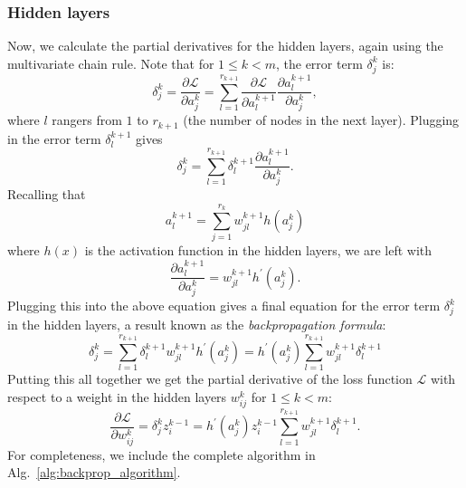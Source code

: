 \documentclass[../main.tex]{subfiles}
\begin{document}
\subsubsection{Hidden layers}
Now, we calculate the partial derivatives for the hidden layers, again using
the multivariate chain rule.
%
Note that for $1 \leq k < m$, the error term $\delta_{j}^{k}$ is:
%
\begin{equation}
  \delta_{j}^{k} 
  = \frac{\partial\mathcal{L}}{\partial a_{j}^{k}} 
  = \sum_{l=1}^{r_{k+1}} \frac{\partial\mathcal{L}}{\partial
    a_{l}^{k+1}}\frac{\partial a_{l}^{k+1}}{\partial a_{j}^{k}},
\end{equation}
%
where $l$ rangers from $1$ to $r_{k+1}$ (the number of nodes in the next
layer).
%
Plugging in the error term $\delta_{l}^{k+1}$ gives
%
\begin{equation}
  \delta_{j}^{k} = \sum_{l=1}^{r_{k+1}} \delta_{l}^{k+1} \frac{\partial
    a_{l}^{k+1}}{\partial a_{j}^{k}}.
\end{equation}
%
Recalling that
%
\begin{equation}
  a_{l}^{k+1} = \sum_{j=1}^{r_{k}} w_{jl}^{k+1} h(a_{j}^{k})
\end{equation}
%
where $h(x)$ is the activation function in the hidden layers, we are left with
%
\begin{equation}
  \frac{\partial a_{l}^{k+1}}{\partial a_{j}^{k}} = w_{jl}^{k+1}
    h^{\prime}(a_{j}^{k}).
\end{equation}
%
Plugging this into the above equation gives a final equation for the error term
$\delta_{j}^{k}$ in the hidden layers, a result known as the
\emph{backpropagation formula}:
%
\begin{equation}
  \delta_{j}^{k} 
  = \sum_{l=1}^{r_{k+1}} \delta_{l}^{k+1} w_{jl}^{k+1}
      h^{\prime}(a_{j}^{k}) 
  = h^{\prime}(a_{j}^{k})\sum_{l=1}^{r_{k+1}} w_{jl}^{k+1} \delta_{l}^{k+1}
\label{eq:hidden_layers}
\end{equation}
%
Putting this all together we get the partial derivative of the loss function
$\mathcal{L}$ with respect to a weight in the hidden layers $w_{ij}^{k}$ for $1
\leq k < m$:
%
\begin{equation}
  \frac{\partial \mathcal{L}}{\partial w_{ij}^{k}} = \delta_{j}^{k} z_{i}^{k-1}
  = h^{\prime}(a_{j}^{k})z_{i}^{k-1}
    \sum_{l=1}^{r_{k+1}} w_{jl}^{k+1}\delta_{l}^{k+1}.
\label{eq:loss_terms}
\end{equation}
%
For completeness, we include the complete algorithm in
Alg.~\ref{alg:backprop_algorithm}.
\end{document}
